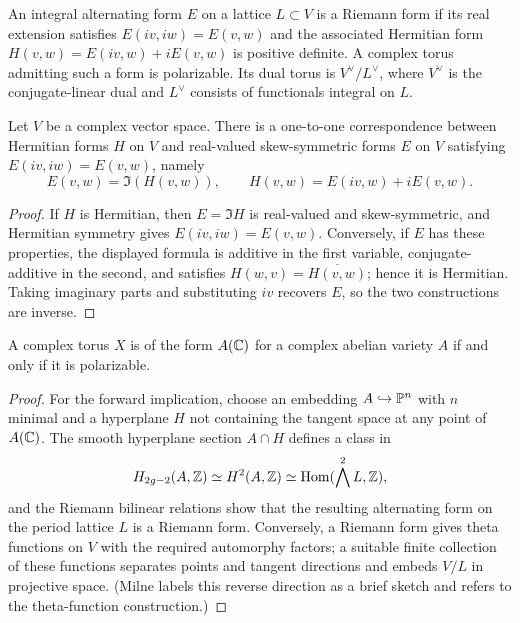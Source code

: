 \begin{definition}
\label{def:milne-riemann-form}

An integral alternating form $E$ on a lattice $L\subset V$ is a Riemann form
if its real extension satisfies $E(iv,iw)=E(v,w)$ and the associated Hermitian
form $H(v,w)=E(iv,w)+iE(v,w)$ is positive definite.  A complex torus admitting
such a form is polarizable.  Its dual torus is $V^\vee/L^\vee$, where
$V^\vee$ is the conjugate-linear dual and $L^\vee$ consists of functionals
integral on $L$.
\end{definition}

\begin{lemma}
\label{lem:milne-riemann-hermitian}

Let $V$ be a complex vector space.  There is a one-to-one correspondence
between Hermitian forms $H$ on $V$ and real-valued skew-symmetric forms $E$ on
$V$ satisfying $E(iv,iw)=E(v,w)$, namely
\[
 E(v,w)=\Im(H(v,w)),\qquad
 H(v,w)=E(iv,w)+iE(v,w).
\]
\end{lemma}

\begin{proof}
If $H$ is Hermitian, then $E=\Im H$ is real-valued and skew-symmetric, and
Hermitian symmetry gives $E(iv,iw)=E(v,w)$.  Conversely, if $E$ has these
properties, the displayed formula is additive in the first variable,
conjugate-additive in the second, and satisfies
$H(w,v)=\overline{H(v,w)}$; hence it is Hermitian.  Taking imaginary parts and
substituting $iv$ recovers $E$, so the two constructions are inverse.
\end{proof}

\begin{theorem}
\label{thm:milne-polarizable-tori}

A complex torus $X$ is of the form $A(\mathbb{C})$ for a complex abelian variety $A$
if and only if it is polarizable.
\end{theorem}

\begin{proof}
For the forward implication, choose an embedding $A\hookrightarrow\mathbb{P}^n$
with $n$ minimal and a hyperplane $H$ not containing the tangent space at any
point of $A(\mathbb{C})$.  The smooth hyperplane section $A\cap H$ defines a class in
\[
 H_{2g-2}(A,\mathbb{Z})\simeq H^2(A,\mathbb{Z})
 \simeq\operatorname{Hom}(\bigwedge^2L,\mathbb{Z}),
\]
and the Riemann bilinear relations show that the resulting alternating form
on the period lattice $L$ is a Riemann form.  Conversely, a Riemann form
gives theta functions on $V$ with the required automorphy factors; a suitable
finite collection of these functions separates points and tangent directions
and embeds $V/L$ in projective space.  (Milne labels this reverse direction
as a brief sketch and refers to the theta-function construction.)
\end{proof}


